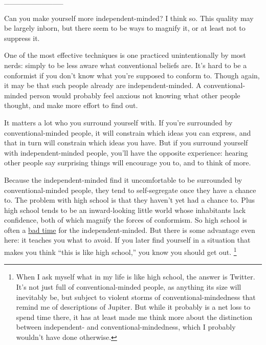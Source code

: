 \documentclass[12pt]{book}
\begin{document}
\_\_\_\_\_\_\_\_\_\_\_

Can you make yourself more independent-minded? I think so. This quality
may be largely inborn, but there seem to be ways to magnify it, or at
least not to suppress it.

One of the most effective techniques is one practiced unintentionally by
most nerds: simply to be less aware what conventional beliefs are. It's
hard to be a conformist if you don't know what you're supposed to
conform to. Though again, it may be that such people already are
independent-minded. A conventional-minded person would probably feel
anxious not knowing what other people thought, and make more effort to
find out.

It matters a lot who you surround yourself with. If you're surrounded by
conventional-minded people, it will constrain which ideas you can
express, and that in turn will constrain which ideas you have. But if
you surround yourself with independent-minded people, you'll have the
opposite experience: hearing other people say surprising things will
encourage you to, and to think of more.

Because the independent-minded find it uncomfortable to be surrounded by
conventional-minded people, they tend to self-segregate once they have a
chance to. The problem with high school is that they haven't yet had a
chance to. Plus high school tends to be an inward-looking little world
whose inhabitants lack confidence, both of which magnify the forces of
conformism. So high school is often a \href{nerds.html}{bad time} for
the independent-minded. But there is some advantage even here: it
teaches you what to avoid. If you later find yourself in a situation
that makes you think ``this is like high school,'' you know you should
get out. \footnote{When I ask myself what in my life is like high school, the
answer is Twitter. It's not just full of conventional-minded people, as
anything its size will inevitably be, but subject to violent storms of
conventional-mindedness that remind me of descriptions of Jupiter. But
while it probably is a net loss to spend time there, it has at least
made me think more about the distinction between independent- and
conventional-mindedness, which I probably wouldn't have done otherwise.}
\end{document}
